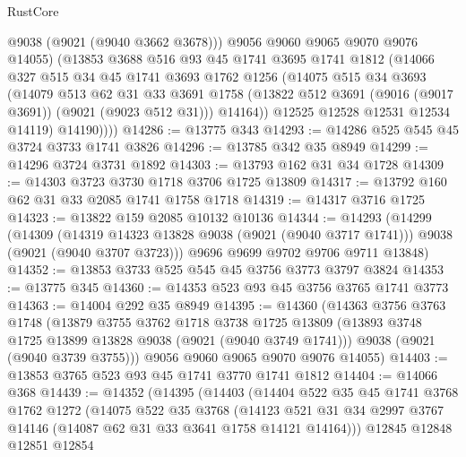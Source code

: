 \begin{lexlean}{RustCore}
\begin{coremodule}
              @9038
              (@9021 (@9040 @3662 @3678)))
            @9056
            @9060
            @9065
            @9070
            @9076
            @14055)
          (@13853
            @3688
            @516
            @93
            @45
            @1741
            @3695
            @1741
            @1812
            (@14066
              @327
              @515
              @34
              @45
              @1741
              @3693
              @1762
              @1256
              (@14075
                @515
                @34
                @3693
                (@14079
                  @513
                  @62
                  @31
                  @33
                  @3691
                  @1758
                  (@13822 @512 @3691 (@9016 (@9017 @3691)) (@9021 (@9023 @512 @31)))
                  @14164))
              @12525
              @12528
              @12531
              @12534
              @14119)
            @14190))))
@14286 := @13775 @343
@14293 := @14286 @525 @545 @45 @3724 @3733 @1741 @3826
@14296 := @13785 @342 @35 @8949
@14299 := @14296 @3724 @3731 @1892
@14303 := @13793 @162 @31 @34 @1728
@14309 := @14303 @3723 @3730 @1718 @3706 @1725 @13809
@14317 := @13792 @160 @62 @31 @33 @2085 @1741 @1758 @1718
@14319 := @14317 @3716 @1725
@14323 := @13822 @159 @2085 @10132 @10136
@14344 := @14293
    (@14299
      (@14309
        (@14319 @14323 @13828 @9038 (@9021 (@9040 @3717 @1741)))
        @9038
        (@9021 (@9040 @3707 @3723)))
      @9696
      @9699
      @9702
      @9706
      @9711
      @13848)
@14352 := @13853 @3733 @525 @545 @45 @3756 @3773 @3797 @3824
@14353 := @13775 @345
@14360 := @14353 @523 @93 @45 @3756 @3765 @1741 @3773
@14363 := @14004 @292 @35 @8949
@14395 := @14360
    (@14363
      @3756
      @3763
      @1748
      (@13879
        @3755
        @3762
        @1718
        @3738
        @1725
        @13809
        (@13893 @3748 @1725 @13899 @13828 @9038 (@9021 (@9040 @3749 @1741)))
        @9038
        (@9021 (@9040 @3739 @3755)))
      @9056
      @9060
      @9065
      @9070
      @9076
      @14055)
@14403 := @13853 @3765 @523 @93 @45 @1741 @3770 @1741 @1812
@14404 := @14066 @368
@14439 := @14352
    (@14395
      (@14403
        (@14404
          @522
          @35
          @45
          @1741
          @3768
          @1762
          @1272
          (@14075
            @522
            @35
            @3768
            (@14123 @521 @31 @34 @2997 @3767 @14146 (@14087 @62 @31 @33 @3641 @1758 @14121 @14164)))
          @12845
          @12848
          @12851
          @12854

\end{coremodule}
\end{lexlean}
